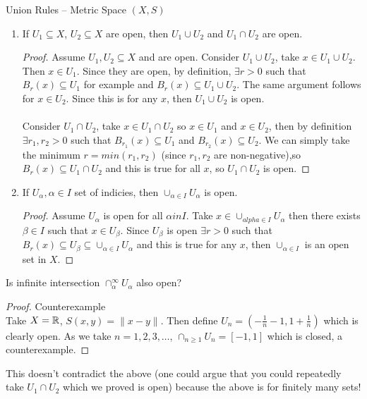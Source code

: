 \documentclass[a4paper]{article}
\begin{document}
\begin{prop}
  Union Rules -- Metric Space $(X, S)$
  \begin{enumerate}
    \item If $U_1 \subseteq X$, $U_2 \subseteq X$ are open, then $U_1 \cup U_2$ and $U_1 \cap U_2$ are open.
      \begin{proof}
        Assume $U_1, U_2 \subseteq X$ and are open. Consider $U_1 \cup U_2$, take $x \in U_1 \cup U_2$. Then $x \in
        U_1$. Since they are open, by definition, $\exists r > 0$ such that $B_r (x) \subseteq U_1$ for example and 
        $B_r (x) \subseteq U_1 \cup U_2$. The same argument follows for $x \in U_2$. Since this is for any $x$, then $U_1 \cup U_2$ is open. \\ \\
        Consider $U_1 \cap U_2$, take $x \in U_1 \cap U_2$ so $x \in U_1$ and $x \in U_2$, then by definition $\exists r_1,r_2 > 0$ such that $B_{r_1}(x) \subseteq U_1$
        and $B_{r_2}(x) \subseteq U_2$. We can simply take the minimum $r = min(r_1,r_2)$ (since $r_1,r_2$ are non-negative),so 
        $B_r(x) \subseteq U_1 \cap U_2$ and this is true for all $x$, so $U_1 \cap U_2$ is open. 
      \end{proof}
    \item If $U_{\alpha}, \alpha \in I$ set of indicies, then $\cup_{\alpha \in I} U_{\alpha}$ is open.
      \begin{proof}
        Assume $U_\alpha$ is open for all $\alpha in I$. Take $x \in \cup_{alpha \in I} U_\alpha$ then there exists $\beta \in I$ such that 
        $x \in U_{\beta}$. Since $U_\beta$ is open $\exists r > 0$ such that $B_r(x) \subseteq U_\beta \subseteq 
        \cup_{\alpha \in I} U_\alpha$ and this is true for any $x$, then $\cup_{\alpha \in I}$ is an open set in $X$.
      \end{proof}
  \end{enumerate}
\end{prop}

\begin{remark}
  Is infinite intersection $\cap_{\alpha}^\infty U_{\alpha}$ also open?
  \begin{proof}{Counterexample}\\
    Take $X = \mathbb{R}$, $S(x,y) = \| x -y\|$. Then define $U_n =\left( - \frac{1}{n} -1 , 1 + \frac{1}{n} \right)$ which
    is clearly open. As we take $n = 1,2,3,\ldots$, $\cap_{n \geq 1} U_n = [-1,1]$ which is closed, a counterexample.
  \end{proof}
  This doesn't contradict the above (one could argue that you could repeatedly take $U_1 \cap U_2$ which we proved is open)
  because the above is for finitely many sets!
\end{remark}
\end{document}
